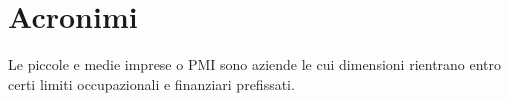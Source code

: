 {}
\chapter*{Acronimi}
\begin{acronym}[UML]
    	
	{\small Le piccole e medie imprese o PMI sono aziende le cui dimensioni rientrano entro certi limiti occupazionali e finanziari prefissati. \par}
    	
	
	
	
	
\end{acronym}                      
